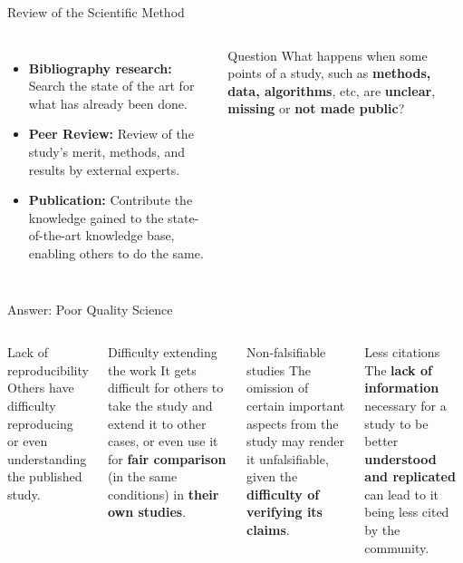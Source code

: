 \documentclass[aspectratio=169]{beamer}
\begin{document}
\begin{frame}{Review of the Scientific Method}
  \begin{columns}[T,onlytextwidth]
      \begin{itemize}
        \item \textbf{Bibliography research:} Search the state of the art for what has already been done.
        \item \textbf{Peer Review:} Review of the study's merit, methods, and results by external experts.
        \item \textbf{Publication:} Contribute the knowledge gained to the state-of-the-art knowledge base, enabling others to do the same.
      \end{itemize}
      
      \vspace{1em}
      \begin{block}{Question}
        What happens when some points of a study, such as \textbf{methods, data, algorithms}, etc, are \textbf{unclear},  \textbf{missing} or \textbf{not made public}?
      \end{block}

      \centering
      \vspace{1em}
      \textcolor{cookieMuted}{\resizebox{\textwidth}{!}{}}
  \end{columns}
\end{frame}

\begin{frame}[fragile]{Answer: Poor Quality Science}
  \begin{columns}[T,onlytextwidth]
      \begin{block}{Lack of reproducibility}
        Others have difficulty reproducing or even understanding the published study.
      \end{block}

      \begin{alertblock}{Difficulty extending the work}
        It gets difficult for others to take the study and extend it to other cases, or even use it for \textbf{fair comparison} (in the same conditions) in \textbf{their own studies}.
      \end{alertblock}

      \begin{alertblock}{Non-falsifiable studies}
        The omission of certain important aspects from the study may render it unfalsifiable, given the \textbf{difficulty of verifying its claims}.
      \end{alertblock}

      \begin{block}{Less citations}
        The \textbf{lack of information} necessary for a study to be better \textbf{understood and replicated} can lead to it being less cited by the community.
      \end{block}
  \end{columns}
\end{frame}
\end{document}
